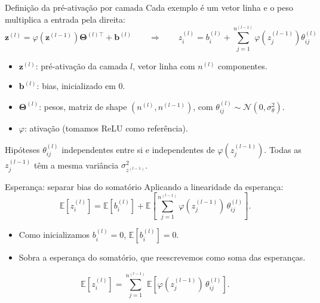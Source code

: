 \documentclass[aspectratio=169,xcolor=dvipsnames]{beamer}
\begin{document}
  \begin{frame}{Definição da pré-ativação por camada}
    Cada exemplo é um vetor linha e o peso multiplica a entrada pela direita:
    \[
      \mathbf{z}^{(l)} = \varphi\!\left(\mathbf{z}^{(l-1)}\right)\mathbf{\Theta}^{(l)\top} + \mathbf{b}^{(l)}
      \qquad\Longrightarrow\qquad
      z^{(l)}_i = b^{(l)}_i + \sum_{j=1}^{n^{(l-1)}} \varphi\!\left(z^{(l-1)}_j\right)\theta^{(l)}_{ij}
    \]
    \begin{itemize}
      \item $\mathbf{z}^{(l)}$: pré-ativação da camada $l$, vetor linha com $n^{(l)}$ componentes.
      \item $\mathbf{b}^{(l)}$: bias, \alert{inicializado em 0}.
      \item $\mathbf{\Theta}^{(l)}$: pesos, matriz de shape $(n^{(l)}, n^{(l-1)})$,
        com $\theta^{(l)}_{ij} \sim \mathcal{N}(0,\sigma_\theta^2)$.
      \item $\varphi$: ativação (tomamos ReLU como referência).
    \end{itemize}
    \vfill
    \begin{block}{Hipóteses}
      $\theta^{(l)}_{ij}$ independentes entre si e independentes de
      $\varphi(z^{(l-1)}_j)$. Todas as $z^{(l-1)}_j$ têm a mesma variância
      $\sigma^2_{z^{(l-1)}}$.
    \end{block}
  \end{frame}

  \begin{frame}{Esperança: separar bias do somatório}
    Aplicando a linearidade da esperança:
    \[
      \mathbb{E}[z^{(l)}_i]
        = \mathbb{E}[b^{(l)}_i] + \mathbb{E}\!\left[\sum_{j=1}^{n^{(l-1)}} \varphi(z^{(l-1)}_j)\,\theta^{(l)}_{ij}\right].
    \]
    \begin{itemize}
      \item Como inicializamos $b^{(l)}_i = 0$, $\mathbb{E}[b^{(l)}_i] = 0$.
      \item Sobra a esperança do somatório, que reescrevemos como soma das esperanças.
    \end{itemize}
    \[
      \mathbb{E}[z^{(l)}_i] = \sum_{j=1}^{n^{(l-1)}} \mathbb{E}\!\left[\varphi(z^{(l-1)}_j)\,\theta^{(l)}_{ij}\right].
    \]
  \end{frame}
\end{document}

